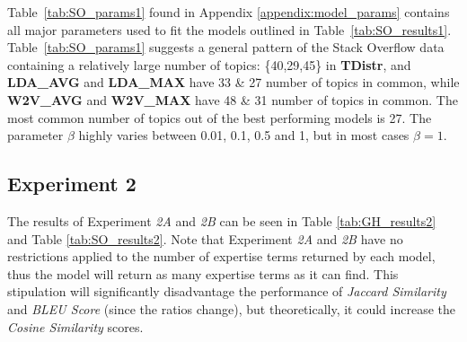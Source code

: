             Table~\ref{tab:SO_params1} found in Appendix \ref{appendix:model_params} contains all major parameters used to fit the models outlined in Table~\ref{tab:SO_results1}. Table~\ref{tab:SO_params1} suggests a general pattern of the Stack Overflow data containing a relatively large number of topics: \{40,29,45\} in  \textbf{TDistr}, and \textbf{LDA\_AVG} and \textbf{LDA\_MAX} have 33 \& 27 number of topics in common, while \textbf{W2V\_AVG} and \textbf{W2V\_MAX} have 48 \& 31 number of topics in common. The most common number of topics out of the best performing models is 27. The parameter $\beta$ highly varies between 0.01, 0.1, 0.5 and 1, but in most cases $\beta=1$.
        
        \subsection{Experiment 2}
            The results of Experiment \emph{2A} and \emph{2B} can be seen in Table \ref{tab:GH_results2} and Table \ref{tab:SO_results2}. Note that Experiment \emph{2A} and \emph{2B} have no restrictions applied to the number of expertise terms returned by each model, thus the model will return as many expertise terms as it can find. This stipulation will significantly disadvantage the performance of \emph{Jaccard Similarity} and \emph{BLEU Score} (since the ratios change), but theoretically, it could increase the \emph{Cosine Similarity} scores. 
            
